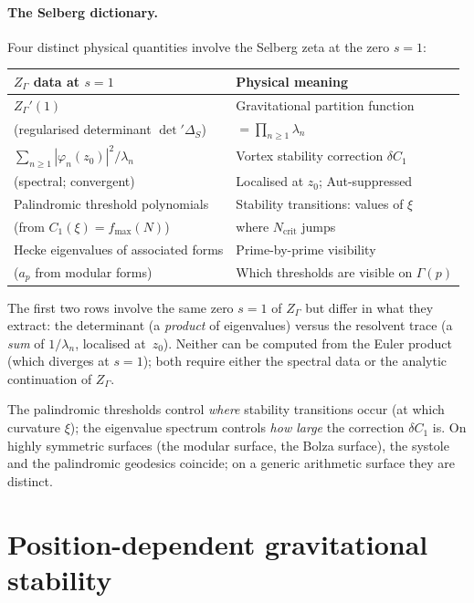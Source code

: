 \paragraph{The Selberg dictionary.}
Four distinct physical quantities involve the Selberg
zeta at the zero $s = 1$:
\begin{center}
\small
\begin{tabular}{ll}
\toprule
$Z_\Gamma$ data at $s = 1$ & Physical meaning \\
\midrule
$Z_\Gamma'(1)$ &
  Gravitational partition function \\
  \quad(regularised determinant $\det{}'\Delta_S$) &
  $= \prod_{n \ge 1}\lambda_n$ \\[4pt]
$\sum_{n \ge 1} |\varphi_n(z_0)|^2/\lambda_n$ &
  Vortex stability correction $\delta C_1$ \\
  \quad(spectral; convergent) &
  Localised at $z_0$; Aut-suppressed \\[4pt]
Palindromic threshold polynomials &
  Stability transitions: values of $\xi$ \\
  \quad(from $C_1(\xi) = f_{\max}(N)$) &
  where $N_{\mathrm{crit}}$ jumps \\[4pt]
Hecke eigenvalues of associated forms &
  Prime-by-prime visibility \\
  \quad($a_p$ from modular forms) &
  Which thresholds are visible on $\Gamma(p)$ \\
\bottomrule
\end{tabular}
\end{center}
The first two rows involve the same zero $s = 1$ of
$Z_\Gamma$ but differ in what they extract:
the determinant (a \emph{product} of eigenvalues) versus
the resolvent trace (a \emph{sum} of $1/\lambda_n$,
localised at~$z_0$).
Neither can be computed from the Euler product
(which diverges at $s = 1$); both require either the
spectral data or the analytic continuation of $Z_\Gamma$.

The palindromic thresholds control
\emph{where} stability transitions occur (at which
curvature $\xi$); the eigenvalue spectrum controls
\emph{how large} the correction $\delta C_1$ is.
On highly symmetric surfaces (the modular surface,
the Bolza surface), the systole and the palindromic
geodesics coincide; on a generic arithmetic surface
they are distinct.

\section{Position-dependent gravitational stability}

